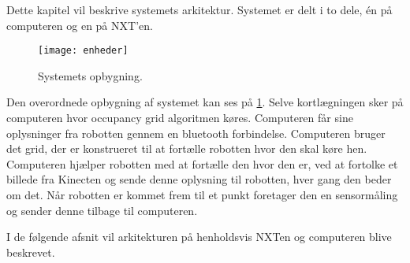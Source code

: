 Dette kapitel vil beskrive systemets arkitektur.
Systemet er delt i to dele, én på computeren og en på NXT'en.


\begin{figure}[H]
\centering
\texttt{[image: enheder]}
\caption{Systemets opbygning.}
\label{arkitektur:opbygning}
\end{figure}

Den overordnede opbygning af systemet kan ses på \cref{arkitektur:opbygning}.
Selve kortlægningen sker på computeren hvor occupancy grid algoritmen køres.
Computeren får sine oplysninger fra robotten gennem en bluetooth forbindelse.
Computeren bruger det grid, der er konstrueret til at fortælle robotten hvor den skal køre hen.
Computeren hjælper robotten med at fortælle den hvor den er, ved at fortolke et billede fra Kinecten og sende denne oplysning til robotten, hver gang den beder om det.
Når robotten er kommet frem til et punkt foretager den en sensormåling og sender denne tilbage til computeren.

I de følgende afsnit vil arkitekturen på henholdsvis NXTen og computeren blive beskrevet.

